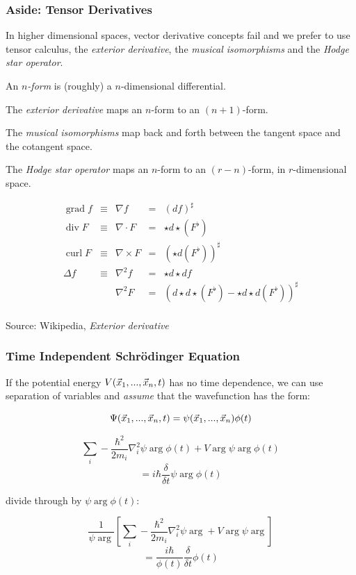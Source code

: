 \documentclass{beamer}
\begin{document}
\begin{frame}
\frametitle{Aside: Tensor Derivatives}

In higher dimensional spaces, vector derivative concepts fail and we prefer to use tensor calculus, the {\it exterior derivative},
the {\it musical isomorphisms} and the {\it Hodge star operator}.

\vskip 12pt

An {\it $n$-form} is (roughly) a $n$-dimensional differential.

The {\it exterior derivative} maps an $n$-form to an $(n+1)$-form.

The {\it musical isomorphisms} map back and forth between the tangent space and the cotangent space.

The {\it Hodge star operator} maps an $n$-form to an $(r-n)$-form, in $r$-dimensional space.

\[
\begin{array}{rcccl}
  \operatorname{grad} f &\equiv& \nabla f        &=& \left( d f \right)^\sharp \\
  \operatorname{div} F  &\equiv& \nabla \cdot F  &=& {\star d {\star} \mathord{\left( F^\flat \right)}} \\
  \operatorname{curl} F &\equiv& \nabla \times F &=& \left( {\star} d \mathord{\left( F^\flat \right)} \right)^\sharp \\
  \Delta f              &\equiv& \nabla^2 f      &=& {\star} d {\star} d f \\
                        &      & \nabla^2 F      &=& \left(d{\star}d{\star}\mathord{\left(F^{\flat}\right)} - {\star}d{\star}d\mathord{\left(F^{\flat}\right)}\right)^{\sharp} \\
\end{array}
\]

Source: Wikipedia, {\it Exterior derivative}

\end{frame}

\begin{frame}
\frametitle{Time Independent Schr\"odinger Equation}
If the potential energy $V(\vec{x}_1,...,\vec{x}_n,t)$ has no time dependence, we can 
use separation of variables and {\it assume} that the wavefunction has the form:

\[ \Psi(\vec{x}_1,...,\vec{x}_n,t) = \psi(\vec{x}_1,...,\vec{x}_n)\phi(t) \]

\[\sum_i - \frac{\hbar^2}{2m_i}\nabla_i^2 \psi\arg\phi(t) + V\arg\psi\arg\phi(t) \]
\[ = i \hbar\frac{\delta}{\delta t} \psi\arg\phi(t) \]

divide through by $\psi\arg\phi(t)$:

\[ \frac{1}{\psi\arg} \left[ \sum_i - \frac{\hbar^2}{2m_i}\nabla_i^2 \psi\arg + V\arg\psi\arg \right] \]
\[ = \frac{i\hbar}{\phi(t)} \frac{\delta}{\delta t} \phi(t) \]

\end{frame}
\end{document}
